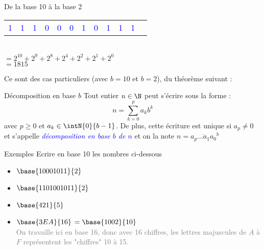 \documentclass[10pt]{beamer}
\begin{document}
\begin{frame}{\Ctitle}{\stitle}
\begin{block}{De la base 10 à la base 2}
\begin{itemize}
\begin{tabular}{p{0.4cm}|p{0.4cm}|p{0.4cm}|p{0.4cm}|p{0.4cm}|p{0.4cm}|p{0.4cm}|p{0.4cm}|p{0.4cm}|p{0.4cm}|p{0.4cm}c}
				      \hline
				      \textcolor{blue}{1}                          & \textcolor{blue}{1}                         & \textcolor{blue}{1}                         & \textcolor{blue}{0}                         & \textcolor{blue}{0}                         & \textcolor{blue}{0}                         & \textcolor{blue}{1}                         & \textcolor{blue}{0}                         & \textcolor{blue}{1}                         & \textcolor{blue}{1}                         & \textcolor{blue}{1}                           \\
			      \end{tabular}
			       \\ \textcolor{BrickRed}{$\scriptstyle{= 2^{10} + 2^9 + 2^8 + 2^4 + 2^2 + 2^1 + 2^0}$}
			      \onslide<3-> \\ \textcolor{BrickRed}{$\scriptstyle{= 1815}$}
		\end{itemize}
	\end{block}
\end{frame}

\begin{frame}{\Ctitle}{\stitle}
	Ce sont des cas particuliers (avec $b=10$ et $b=2$), du théorème suivant  :
	\begin{alertblock}{Décomposition en base $b$}
		Tout entier $n \in \N$ peut s'écrire sous la forme :
		$$ n = \sum_{k=0}^{p} a_k b^k$$
		avec $p \geq 0$ et $a_k \in \intN{0}{b-1}$. De plus, cette écriture est unique si $a_p \neq 0$ et s'appelle \textcolor{blue}{\textit{décomposition en base $b$ de $n$}} et on la note $n = \overline{a_p\dots a_1 a_0}^b$
	\end{alertblock}
\end{frame}


\begin{frame}{\Ctitle}{\stitle}
	\begin{exampleblock}{Exemples}
		Ecrire en base 10 les nombres ci-dessous
		\begin{itemize}
			\item<1-> $\base{10001011}{2}$
				\onslide<6->{\textcolor{OliveGreen}{$=\base{139}{10}$}}
			\item <2-> $\base{1101001011}{2}$
			      \onslide<7->{\textcolor{OliveGreen}{$=\base{843}{10}$} }
			\item<3-> $\base{421}{5}$
				\onslide<8->{\textcolor{OliveGreen}{$=\base{111}{10}$}}
			\item<4-> $\base{3EA}{16}$
				\onslide<9-> {\textcolor{OliveGreen}{$=\base{1002}{10}$}}\\
				\onslide<5->\textcolor{gray}{\small On travaille ici en base 16, donc avec 16 chiffres, les lettres majuscules de $A$ à $F$ représentent les "chiffres" 10 à 15.}  \\
		\end{itemize}
	\end{exampleblock}
\end{frame}
\end{document}
